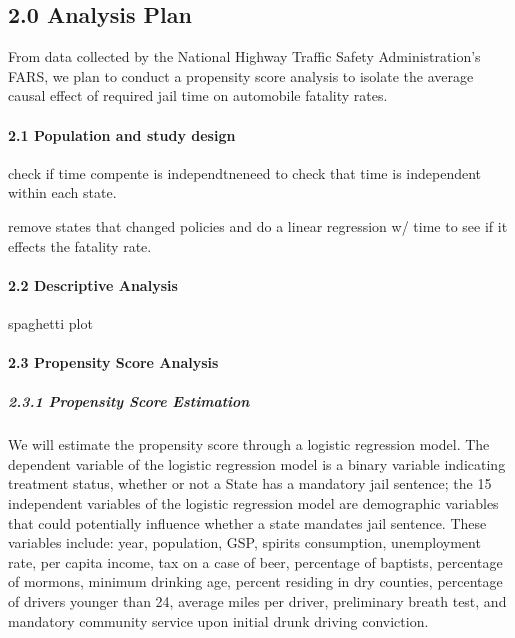 \documentclass[]{article}
\let\oldparagraph\paragraph
\renewcommand{\paragraph}[1]{\oldparagraph{#1}\mbox{}}
\let\oldsubparagraph\subparagraph
\renewcommand{\subparagraph}[1]{\oldsubparagraph{#1}\mbox{}}
\begin{document}
\hypertarget{analysis-plan}{%
\subsection{2.0 Analysis Plan}\label{analysis-plan}}

From data collected by the National Highway Traffic Safety Administration's FARS, we plan to conduct a propensity score analysis to isolate the average causal effect of required jail time on automobile fatality rates.

\hypertarget{population-and-study-design}{%
\paragraph{2.1 Population and study design}\label{population-and-study-design}}

check if time compente is independtneneed to check that time is independent within each state.

remove states that changed policies and do a linear regression w/ time to see if it effects the fatality rate.

\hypertarget{descriptive-analysis}{%
\paragraph{2.2 Descriptive Analysis}\label{descriptive-analysis}}

spaghetti plot

\hypertarget{propensity-score-analysis}{%
\paragraph{2.3 Propensity Score Analysis}\label{propensity-score-analysis}}

\hypertarget{propensity-score-estimation-1}{%
\subparagraph{2.3.1 Propensity Score Estimation}\label{propensity-score-estimation-1}}

We will estimate the propensity score through a logistic regression model. The dependent variable of the logistic regression model is a binary variable indicating treatment status, whether or not a State has a mandatory jail sentence; the 15 independent variables of the logistic regression model are demographic variables that could potentially influence whether a state mandates jail sentence. These variables include: year, population, GSP, spirits consumption, unemployment rate, per capita income, tax on a case of beer, percentage of baptists, percentage of mormons, minimum drinking age, percent residing in dry counties, percentage of drivers younger than 24, average miles per driver, preliminary breath test, and mandatory community service upon initial drunk driving conviction.
\end{document}
